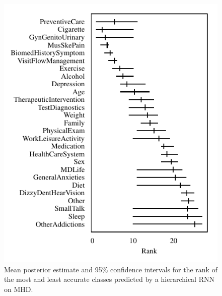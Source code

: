 \documentclass{article}
\begin{document}
\begin{figure}[t]
    \centering
    \includegraphics{figures/mhd_rank.pdf}
    \caption{
        Mean posterior estimate and 95\% confidence intervals for the rank of the most and least accurate classes predicted by a hierarchical RNN on MHD.
        }
    \label{fig:mhd_rank}
\end{figure}

\end{document}
